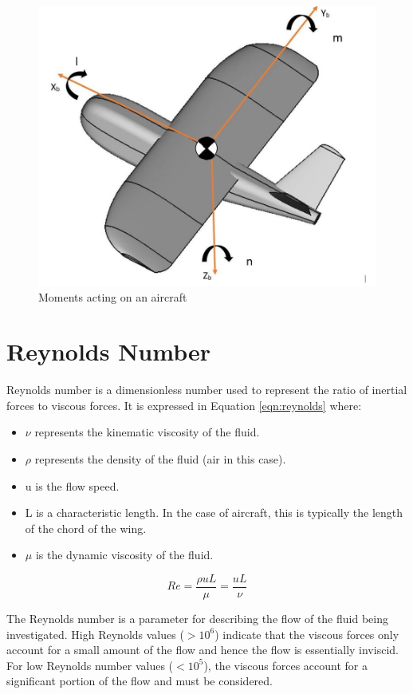\begin{figure}[H]
  \centering
   \includegraphics[width=0.6\linewidth]{02_Background/Figs/thisyee.JPG}
  \caption{Moments acting on an aircraft}
  \label{fig:pitch}
\end{figure}




\section{Reynolds Number} \label{sec:Reynolds}
Reynolds number is a dimensionless number used to represent the ratio of inertial forces to viscous forces. It is expressed in Equation \ref{eqn:reynolds} where:

\begin{itemize}
    \item $\nu$ represents the kinematic viscosity of the fluid.
    \item $\rho$ represents the density of the fluid (air in this case).
    \item u is the flow speed.
    \item L is a characteristic length. In the case of aircraft, this is typically the length of the chord of the wing.
    \item $\mu$ is the dynamic viscosity of the fluid.
\end{itemize} 

\begin{equation}
    Re = \frac{\rho uL}{\mu} = \frac{uL}{\nu}
    \label{eqn:reynolds}
\end{equation}


The Reynolds number is a parameter for describing the flow of the fluid being investigated. High Reynolds values ($> 10^{6}$) indicate that the viscous forces only account for a small amount of the flow and hence the flow is essentially inviscid. For low Reynolds number values ($< 10^{5}$), the viscous forces account for a significant portion of the flow and must be considered.




